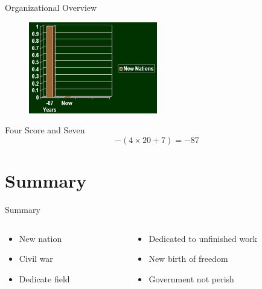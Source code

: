 \documentclass{beamer}
\begin{document}
\begin{frame}{Organizational Overview}

\begin{figure}
\includegraphics[width=0.5\textwidth]{gettysburg_graph}
\end{figure}

\begin{block}{Four Score and Seven}
\begin{equation}
-(4 \times 20 + 7) = -87
\end{equation}
\end{block}

\end{frame}

\section{Summary}

\begin{frame}{Summary}

\begin{columns}
\begin{column}{0.4\textwidth}
\begin{itemize}
\item New nation
\item Civil war
\item Dedicate field
\end{itemize}
\end{column}
\begin{column}{0.6\textwidth}
\begin{itemize}
\item Dedicated to unfinished work
\item New birth of freedom
\item Government not perish
\end{itemize}
\end{column}
\end{columns}

\end{frame}
\end{document}
